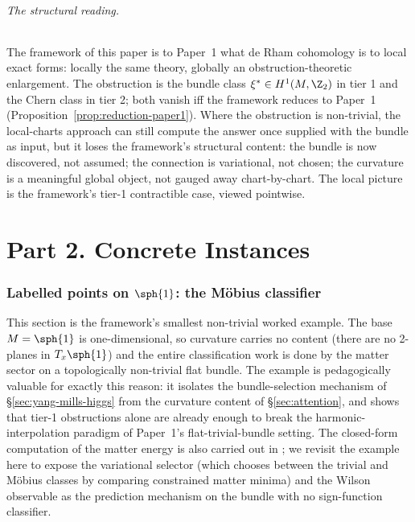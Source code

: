\begin{remark}
\paragraph{The structural reading.} The framework of this paper is
to Paper~1 what de Rham cohomology is to local exact forms: locally
the same theory, globally an obstruction-theoretic enlargement. The
obstruction is the bundle class $\xi^*\in H^1(M,\Z_2)$ in tier 1
and the Chern class in tier 2; both vanish iff the framework
reduces to Paper~1 (Proposition~\ref{prop:reduction-paper1}). Where
the obstruction is non-trivial, the local-charts approach can still
compute the answer once supplied with the bundle as input, but it
loses the framework's structural content: the bundle is now
discovered, not assumed; the connection is variational, not chosen;
the curvature is a meaningful global object, not gauged away
chart-by-chart. The local picture is the framework's tier-1
contractible case, viewed pointwise.
\end{remark}

\part*{Part 2. Concrete Instances}

\section{Labelled points on $\sph{1}$: the M\"obius classifier}
\label{sec:S1-mobius}

This section is the framework's smallest non-trivial worked example.
The base $M=\sph{1}$ is one-dimensional, so curvature carries no
content (there are no 2-planes in $T_x\sph{1}$) and the entire
classification work is done by the matter sector on a topologically
non-trivial flat bundle. The example is pedagogically valuable for
exactly this reason: it isolates the bundle-selection mechanism of
\S\ref{sec:yang-mills-higgs} from the curvature content of
\S\ref{sec:attention}, and shows that tier-1 obstructions alone are
already enough to break the harmonic-interpolation paradigm of
Paper~1's flat-trivial-bundle setting. The closed-form computation of
the matter energy is also carried out in \cite[\S 9.2]{Vasii2026Paper1};
we revisit the example here to expose the variational selector
(which chooses between the trivial and M\"obius classes by
comparing constrained matter minima) and the Wilson observable as
the prediction mechanism on the bundle with no sign-function
classifier.

